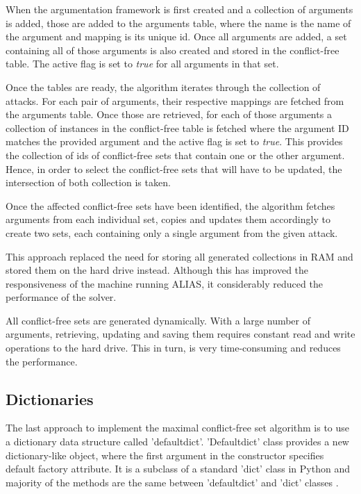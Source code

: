 When the argumentation framework is first created and a collection of arguments is added, those are added to the arguments table, where the name is the name of the argument and mapping is its unique id. Once all arguments are added, a set containing all of those arguments is also created and stored in the conflict-free table. The active flag is set to \textit{true} for all arguments in that set.

Once the tables are ready, the algorithm iterates through the collection of attacks. For each pair of arguments, their respective mappings are fetched from the arguments table. Once those are retrieved, for each of those arguments a collection of instances in the conflict-free table is fetched where the argument ID matches the provided argument and the active flag is set to \textit{true}. This provides the collection of ids of conflict-free sets that contain one or the other argument. Hence, in order to select the conflict-free sets that will have to be updated, the intersection of both collection is taken.

Once the affected conflict-free sets have been identified, the algorithm fetches arguments from each individual set, copies and updates them accordingly to create two sets, each containing only a single argument from the given attack.

This approach replaced the need for storing all generated collections in RAM and stored them on the hard drive instead. Although this has improved the responsiveness of the machine running ALIAS, it considerably reduced the performance of the solver. 

All conflict-free sets are generated dynamically. With a large number of arguments, retrieving, updating and saving them requires constant read and write operations to the hard drive. This in turn, is very time-consuming and reduces the performance.

\subsection{Dictionaries}\label{sec:dicts}
The last approach to implement the maximal conflict-free set algorithm is to use a dictionary data structure called 'defaultdict'. 'Defaultdict' class provides a new dictionary-like object, where the first argument in the constructor specifies default factory attribute. It is a subclass of a standard 'dict' class in Python and majority of the methods are the same between 'defaultdict' and 'dict' classes \citep{defaultdict}.


